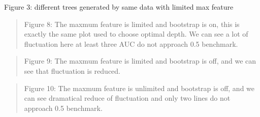\documentclass{article}
\newcommand{\ciapdf}[1]{\vspace*{-\parskip}\begin{center}\resizebox{0.75\textwidth}{!}{\texttt{[image: \#1]}}\end{center}}
\begin{document}
\vspace*{-\parskip}

Figure 3:
different trees generated by same data with limited max feature

\ciapdf{app_samedata_1.pdf}

\ciapdf{app_samedata_2.pdf}

\ciapdf{Figure_8.pdf}
\begin{quote}
Figure 8: The maxmum feature is limited and bootstrap is on, this is
exactly the same plot used to choose optimal depth. We can see a lot of
fluctuation here at least three AUC do not approach 0.5 benchmark.
\end{quote}

\ciapdf{Figure_9.pdf}
\begin{quote}
Figure 9: The maxmum feature is limited and bootstrap is off, and we can
see that fluctuation is reduced.
\end{quote}

\ciapdf{Figure_10.pdf}
\begin{quote}
Figure 10: The maxmum feature is unlimited and bootstrap is off, and we
can see dramatical reduce of fluctuation and only two lines do not
approach 0.5 benchmark.
\end{quote}
\end{document}
